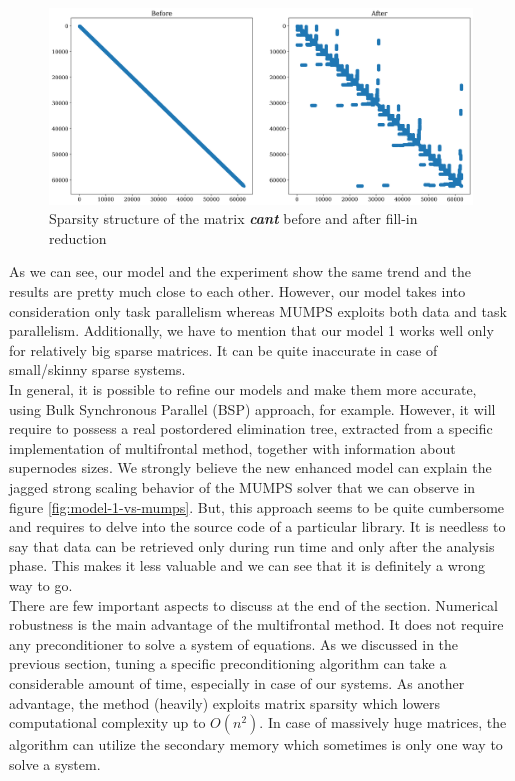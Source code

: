 \figpointer{\ref{fig:cant-matrix-sparsity-pattern}}
\begin{figure}[htpb]
  \centering
  \includegraphics[width=1.00\textwidth]{figures/chapter-2/cant-matrix-sparsity-pattern.png}
\caption{Sparsity structure of the matrix \textit{\textbf{cant}} before and after fill-in reduction}
\label{fig:cant-matrix-sparsity-pattern}
\end{figure}




As we can see, our model and the experiment show the same trend and the results are pretty much close to each other. However, our model takes into consideration only task parallelism whereas MUMPS exploits both data and task parallelism. Additionally, we have to mention that our model 1 works well only for relatively big sparse matrices. It can be quite inaccurate in case of small/skinny sparse systems. \\


In general, it is possible to refine our models and make them more accurate, using Bulk Synchronous Parallel (BSP) approach, for example. However, it will require to possess a real postordered elimination tree, extracted from a specific implementation of multifrontal method, together with information about supernodes sizes. We strongly believe the new enhanced model can explain the jagged strong scaling behavior of the MUMPS solver that we can observe in figure \ref{fig:model-1-vs-mumps}. But, this approach seems to be quite cumbersome and requires to delve into the source code of a particular library. It is needless to say that data can be retrieved only during run time and only after the analysis phase. This makes it less valuable and we can see that it is definitely a wrong way to go.\\


There are few important aspects to discuss at the end of the section. Numerical robustness is the main advantage of the multifrontal method. It does not require any preconditioner to solve a system of equations. As we discussed in the previous section, tuning a specific preconditioning algorithm can take a considerable amount of time, especially in case of our systems. As another advantage, the method (heavily) exploits matrix sparsity which lowers computational complexity up to $O(n^2)$. In case of massively huge matrices, the algorithm can utilize the secondary memory which sometimes is only one way to solve a system.\\


